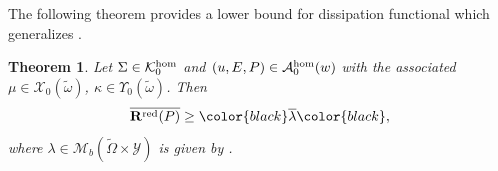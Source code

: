 \documentclass[reqno,10pt]{amsart}
\numberwithin{equation}{section}
\newtheorem{theorem}{Theorem}[section]
\theoremstyle{remark}
\newcommand{\BLACK}{\color{black}}
\newcommand{\PINK}{\color{black}}
\newcommand{\calA}{\mathcal{A}}
\newcommand{\calK}{\mathcal{K}}
\newcommand{\calY}{\mathcal{Y}}
\newcommand{\zerothI}[1]{\overline{#1}}
\newcommand{\Mb}{\mathcal{M}_b}
\newcommand{\calXzero}[1]{\mathcal{X}_0({#1})}
\newcommand{\calYzero}[1]{\Upsilon_0({#1})}
\newcommand{\ext}[1]{\widetilde{#1}}
\newcommand{\disspot}{\mathbf{R}}
\begin{document}
The following theorem provides a lower bound for dissipation functional which generalizes \cite[Theorem 5.31.]{Buzancic.Davoli.Velcic.2024.2nd}.

\begin{theorem} \label{two-scale Hill's principle - regime zero}
Let $\Sigma \in \calK^{\rm hom}_{0}$ and $(u,E,P) \in \calA^{\rm hom}_{0}(w)$ with the associated $\mu \in \calXzero{\ext{\omega}}$, $\kappa \in \calYzero{\ext{\omega}}$. 
Then
\begin{equation*}
	\zerothI{\disspot^{\rm red}\!\left(P\right)} \geq {\PINK\zerothI{\lambda}\BLACK}, 
\end{equation*}
where $\lambda \in \Mb(\ext{\Omega} \times \calY)$ is given by .
\end{theorem}
\end{document}
